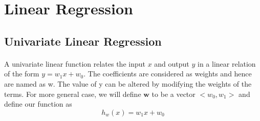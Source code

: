 \documentclass{article}
\begin{document}
















\section{Linear Regression}
    \subsection{Univariate Linear Regression}
        \paragraph{}
            A univariate linear function relates the input $x$ and output $y$ in a linear relation of the form $ y = w_1x + w_0$. The coefficients are considered as weights and hence are named as w. The value of y can be altered by modifying the weights of the terms. For more general case, we will define $\textbf{w}$ to be a vector $<w_0, w_1>$ and define our function as 
            \begin{equation*}
                h_w (x) = w_1 x + w_0
            \end{equation*}
\end{document}

